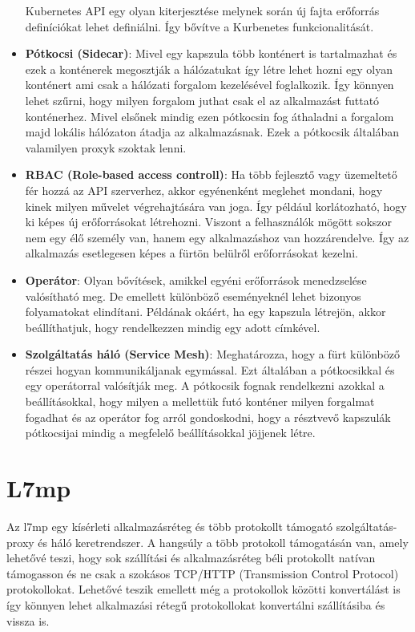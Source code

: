 \begin{itemize}
	Kubernetes API egy olyan kiterjesztése melynek során új fajta erőforrás definíciókat
	lehet definiálni. Így bővítve a Kurbenetes funkcionalitását.
	\item \textbf{Pótkocsi (Sidecar)}: Mivel egy kapszula több konténert is tartalmazhat
	és ezek a konténerek megosztják a hálózatukat így létre lehet hozni egy olyan konténert
	ami csak a hálózati forgalom kezelésével foglalkozik. Így könnyen lehet szűrni, hogy
	milyen forgalom juthat csak el az alkalmazást futtató konténerhez. Mivel elsőnek 
	mindig ezen pótkocsin fog áthaladni a forgalom majd lokális hálózaton átadja az
	alkalmazásnak. Ezek a pótkocsik általában valamilyen proxyk szoktak lenni. 
	\item \textbf{RBAC (Role-based access controll)}: Ha több fejlesztő vagy üzemeltető
	fér hozzá az API szerverhez, akkor egyénenként meglehet mondani, hogy kinek milyen 
	művelet végrehajtására van joga. Így például korlátozható, hogy ki képes új
	erőforrásokat létrehozni. Viszont a felhasználók mögött sokszor nem egy élő 
	személy van, hanem egy alkalmazáshoz van hozzárendelve. Így az alkalmazás esetlegesen
	képes a fürtön belülről erőforrásokat kezelni.
	\item \textbf{Operátor}: Olyan bővítések, amikkel egyéni erőforrások menedzselése
	valósítható meg. De emellett különböző eseményeknél lehet bizonyos folyamatokat 
	elindítani. Példának okáért, ha egy kapszula létrejön, akkor beállíthatjuk, hogy
	rendelkezzen mindig egy adott címkével.
	\item \textbf{Szolgáltatás háló (Service Mesh)}: Meghatározza, hogy a fürt 
	különböző részei hogyan kommunikáljanak egymással. Ezt általában a pótkocsikkal és 
	egy operátorral valósítják meg. A pótkocsik fognak rendelkezni azokkal a beállításokkal,
	hogy milyen a mellettük futó konténer milyen forgalmat fogadhat és az operátor 
	fog arról gondoskodni, hogy a résztvevő kapszulák pótkocsijai mindig a megfelelő
	beállításokkal jöjjenek létre.
\end{itemize}

\section{L7mp}

Az l7mp egy kísérleti alkalmazásréteg és több protokollt támogató szolgáltatás- 
proxy és háló keretrendszer. A hangsúly a több protokoll támogatásán van, amely
lehetővé teszi, hogy sok szállítási és alkalmazásréteg béli protokollt 
natívan támogasson és ne csak a szokásos TCP/HTTP (Transmission Control Protocol) 
protokollokat. Lehetővé teszik emellett még a protokollok közötti konvertálást is 
így könnyen lehet alkalmazási rétegű protokollokat konvertálni szállításiba és vissza is.

